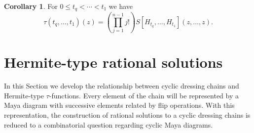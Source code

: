 \documentclass{amsart}
\theoremstyle{definition}
\newtheorem{corollary}{Corollary}
\newcommand{\fs}{\mathfrak{s}}
\begin{document}
\begin{corollary}
  For  $0\leq t_q < \cdots < t_1$ we have
  \[ \tau(t_q,\ldots, t_1)(z) = \left(\prod_{j=1}^{n-1}
      j!\right)S[H_{t_q},\ldots, H_{t_1}](z,\ldots, z). \]
\end{corollary}


\section{Hermite-type rational solutions}
In this Section we develop the relationship between cyclic dressing
chains and Hermite-type $\tau$-functions. Every element of the chain
will be represented by a Maya diagram with successive elements related
by flip operations. With this representation, the construction of
rational solutions to a cyclic dressing chains is reduced to a
combinatorial question regarding cyclic Maya diagrams.
\end{document}
